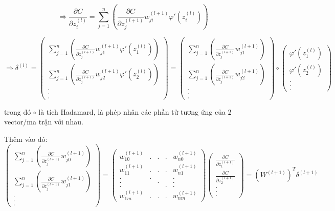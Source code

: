 \documentclass{article}
\begin{document}
\[\Rightarrow \frac{\partial{C}}{\partial{z^{(l)}_{i}}} = \sum_{j=1}^{n}(\frac{\partial{C}}{\partial{z^{(l+1)}_{j}}}w_{ji}^{(l+1)}\varphi'{(z_{i}^{(l)})})\]

\[\Rightarrow \delta^{(l)} = \begin{pmatrix} \sum_{j=1}^{n}(\frac{\partial{C}}{\partial{z^{(l+1)}_{j}}}w_{j1}^{(l+1)}\varphi'{(z_{1}^{(l)})})\\\sum_{j=1}^{n}(\frac{\partial{C}}{\partial{z^{(l+1)}_{j}}}w_{j2}^{(l+1)}\varphi'{(z_{2}^{(l)})})\\.\\.\\. \end{pmatrix} = \begin{pmatrix} \sum_{j=1}^{n}(\frac{\partial{C}}{\partial{z^{(l+1)}_{j}}}w_{j1}^{(l+1)})\\\sum_{j=1}^{n}(\frac{\partial{C}}{\partial{z^{(l+1)}_{j}}}w_{j2}^{(l+1)})\\.\\.\\. \end{pmatrix} \circ \begin{pmatrix}\varphi'{(z_{1}^{(l)})}\\\varphi'{(z_{2}^{(l)})}\\.\\.\\. \end{pmatrix}\]

trong đó $\circ$ là tích Hadamard, là phép nhân các phần tử tương ứng của 2 vector/ma trận với nhau.

Thêm vào đó: 
\[\begin{pmatrix} \sum_{j=1}^{n}(\frac{\partial{C}}{\partial{z^{(l+1)}_{j}}}w_{j0}^{(l+1)})\\\sum_{j=1}^{n}(\frac{\partial{C}}{\partial{z^{(l+1)}_{j}}}w_{j1}^{(l+1)})\\.\\.\\. \end{pmatrix}= \begin{pmatrix}w^{(l+1)}_{10}&.&.&.&w^{(l+1)}_{n0}\\w^{(l+1)}_{11}&.&.&.&w^{(l+1)}_{n1}\\.&.&&&.\\.&&.&&.\\.&&&.&.\\w^{(l+1)}_{1m}&.&.&.&w^{(l+1)}_{nm} \end{pmatrix} \begin{pmatrix} \frac{\partial{C}}{\partial{z^{(l+1)}_{1}}}\\\frac{\partial{C}}{\partial{z^{(l+1)}_{2}}}\\.\\.\\. \end{pmatrix}=(W^{(l+1)})^{T}\delta^{(l+1)}\]
\end{document}

